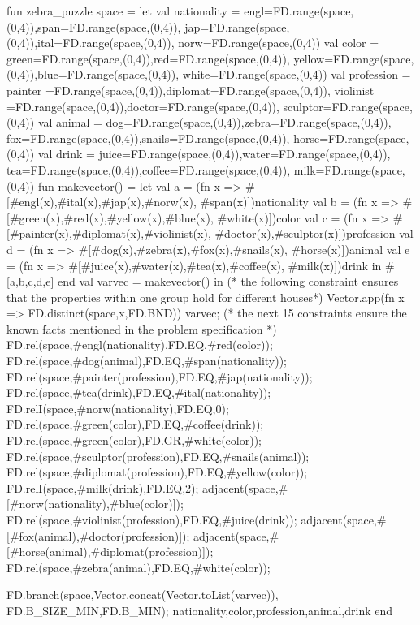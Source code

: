 \documentclass[a4paper,halfparskip]{scrartcl}
\begin{document}
\begin{myverbatim}
   
fun zebra_puzzle space =
  let
     val nationality  = 
       {engl=FD.range(space,(0,4)),span=FD.range(space,(0,4)),
        jap=FD.range(space,(0,4)),ital=FD.range(space,(0,4)),
        norw=FD.range(space,(0,4))}
     val color  =
       {green=FD.range(space,(0,4)),red=FD.range(space,(0,4)),
        yellow=FD.range(space,(0,4)),blue=FD.range(space,(0,4)),
        white=FD.range(space,(0,4))}
     val profession = 
       {painter =FD.range(space,(0,4)),diplomat=FD.range(space,(0,4)),
        violinist =FD.range(space,(0,4)),doctor=FD.range(space,(0,4)),
        sculptor=FD.range(space,(0,4))}
     val animal =
       {dog=FD.range(space,(0,4)),zebra=FD.range(space,(0,4)),
        fox=FD.range(space,(0,4)),snails=FD.range(space,(0,4)),
        horse=FD.range(space,(0,4))}
     val drink  = 
       {juice=FD.range(space,(0,4)),water=FD.range(space,(0,4)),
        tea=FD.range(space,(0,4)),coffee=FD.range(space,(0,4)),
        milk=FD.range(space,(0,4))}
     fun makevector() = 
        let val a = (fn x => #[#engl(x),#ital(x),#jap(x),#norw(x),
                        #span(x)])nationality
            val b = (fn x => #[#green(x),#red(x),#yellow(x),#blue(x),
                        #white(x)])color
            val c = (fn x => #[#painter(x),#diplomat(x),#violinist(x),
                        #doctor(x),#sculptor(x)])profession
            val d = (fn x => #[#dog(x),#zebra(x),#fox(x),#snails(x),
                        #horse(x)])animal
            val e = (fn x => #[#juice(x),#water(x),#tea(x),#coffee(x),
                        #milk(x)])drink
        in
            #[a,b,c,d,e]
        end
     val varvec = makevector()
  in
        (* the following constraint ensures that the properties
           within one group hold for different houses*) 
        Vector.app(fn x => FD.distinct(space,x,FD.BND))
                      varvec;          
        (* the next 15 constraints ensure the known
           facts mentioned in the problem specification *)
        FD.rel(space,#engl(nationality),FD.EQ,#red(color));
        FD.rel(space,#dog(animal),FD.EQ,#span(nationality));
        FD.rel(space,#painter(profession),FD.EQ,#jap(nationality));
        FD.rel(space,#tea(drink),FD.EQ,#ital(nationality));
        FD.relI(space,#norw(nationality),FD.EQ,0);
        FD.rel(space,#green(color),FD.EQ,#coffee(drink));
        FD.rel(space,#green(color),FD.GR,#white(color));
        FD.rel(space,#sculptor(profession),FD.EQ,#snails(animal));
        FD.rel(space,#diplomat(profession),FD.EQ,#yellow(color));
        FD.relI(space,#milk(drink),FD.EQ,2);
        adjacent(space,#[#norw(nationality),#blue(color)]);
        FD.rel(space,#violinist(profession),FD.EQ,#juice(drink));
        adjacent(space,#[#fox(animal),#doctor(profession)]);
        adjacent(space,#[#horse(animal),#diplomat(profession)]);
        FD.rel(space,#zebra(animal),FD.EQ,#white(color));
        
        FD.branch(space,Vector.concat(Vector.toList(varvec)),
                   FD.B_SIZE_MIN,FD.B_MIN);
        {nationality,color,profession,animal,drink}
 end
\end{myverbatim}
\end{document}
